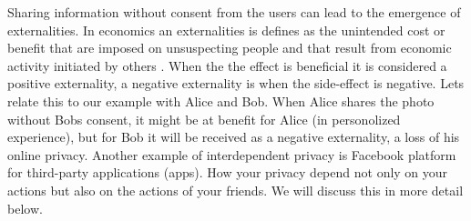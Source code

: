 Sharing information without consent from the users can lead to the emergence of externalities. In economics an externalities is defines as the unintended cost or benefit that are imposed on unsuspecting people and that result from economic activity initiated by others \cite{externalityDef}. When the the effect is beneficial it is considered a positive externality, a negative externality is when the side-effect is negative. Lets relate this to our example with Alice and Bob. When Alice shares the photo without Bobs consent, it might be at benefit for Alice (in personolized experience), but for Bob it will be received as a negative externality, a loss of his online privacy.  
Another example of interdependent privacy is Facebook platform for third-party applications (apps). How your privacy depend not only on your actions but also on the actions of your friends. We will discuss this in more detail below.   


